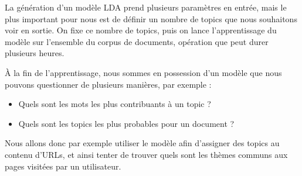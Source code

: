 			La génération d'un modèle LDA prend plusieurs paramètres en entrée, mais le plus important pour nous est de définir un nombre de topics que nous souhaitons voir en sortie. On fixe ce nombre de topics, puis on lance l'apprentissage du modèle sur l'ensemble du corpus de documents, opération que peut durer plusieurs heures.

			À la fin de l'apprentissage, nous sommes en possession d'un modèle que nous pouvons questionner de plusieurs manières, par exemple :
			\begin{itemize}
				\item Quels sont les mots les plus contribuants à un topic ?
				\item Quels sont les topics les plus probables pour un document ?
			\end{itemize}

			Nous allons donc par exemple utiliser le modèle afin d'assigner des topics au contenu d'URLs, et ainsi tenter de trouver quels sont les thèmes communs aux pages visitées par un utilisateur.